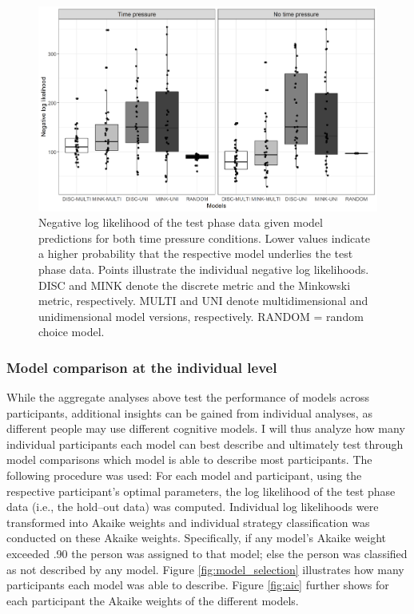 \documentclass[a4paper,man,natbib]{apa6}
\begin{document}
\begin{figure}
\centering
\includegraphics[width = \textwidth]{fig_log_lik.png}
\caption{Negative log likelihood of the test phase data given model predictions for both time pressure conditions. Lower values indicate a higher probability that the respective model underlies the test phase data. Points illustrate the individual negative log likelihoods. DISC and MINK denote the discrete metric and the Minkowski metric, respectively. MULTI and UNI denote multidimensional and unidimensional model versions, respectively. RANDOM = random choice model.}
\label{fig:log_lik}
\end{figure}

\subsubsection{Model comparison at the individual level} \label{sec:res_ind}
While the aggregate analyses above test the performance of models across participants, additional insights can be gained from individual analyses, as different people may use different cognitive models. I will thus analyze how many individual participants each model can best describe and ultimately test through model comparisons which model is able to describe most participants. 
The following procedure was used: For each model and participant, using the respective participant's optimal parameters, the log likelihood of the test phase data (i.e., the hold--out data) was computed. Individual log likelihoods were transformed into Akaike weights \citep{wagenmakers2004aic} and individual strategy classification was conducted on these Akaike weights. Specifically, if any model’s Akaike weight exceeded .90 the person was assigned to that model; else the person was classified as not described by any model. Figure \ref{fig:model_selection} illustrates how many participants each model was able to describe. Figure \ref{fig:aic} further shows for each participant the Akaike weights of the different models.
\end{document}

